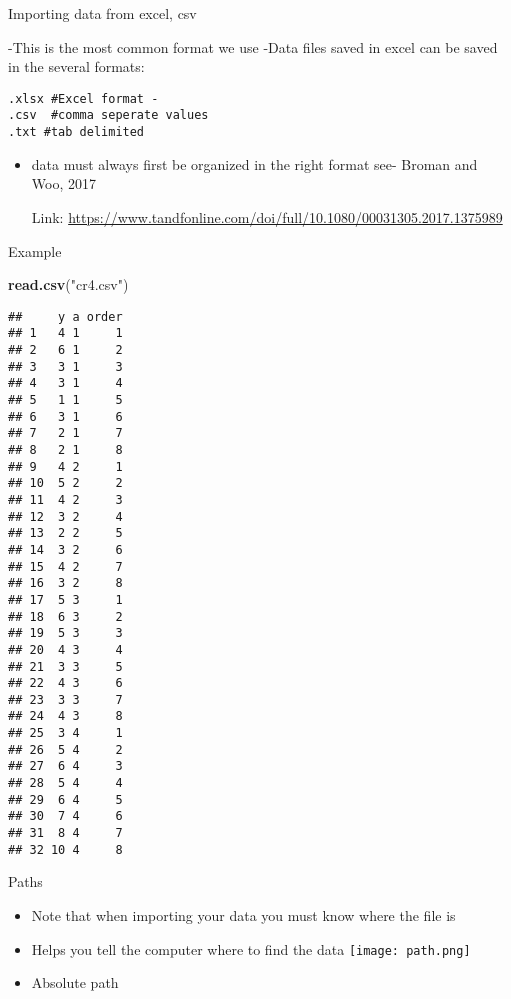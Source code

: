 \documentclass[
  ignorenonframetext,
]{beamer}
\newenvironment{Shaded}{\begin{snugshade}}{\end{snugshade}}
\newcommand{\KeywordTok}[1]{\textcolor[rgb]{0.13,0.29,0.53}{\textbf{#1}}}
\newcommand{\NormalTok}[1]{#1}
\newcommand{\StringTok}[1]{\textcolor[rgb]{0.31,0.60,0.02}{#1}}
\begin{document}
\begin{frame}[fragile]{Importing data from excel, csv}
\protect\hypertarget{importing-data-from-excel-csv}{}

-This is the most common format we use -Data files saved in excel can be
saved in the several formats:

\begin{verbatim}
.xlsx #Excel format -
.csv  #comma seperate values
.txt #tab delimited
\end{verbatim}

\begin{itemize}
\item
  data must always first be organized in the right format see- Broman
  and Woo, 2017

  Link:
  \url{https://www.tandfonline.com/doi/full/10.1080/00031305.2017.1375989}
\end{itemize}

\end{frame}

\begin{frame}[fragile]{Example}
\protect\hypertarget{example}{}

\begin{Shaded}
\begin{Highlighting}[]
\KeywordTok{read.csv}\NormalTok{(}\StringTok{"cr4.csv"}\NormalTok{)}
\end{Highlighting}
\end{Shaded}

\begin{verbatim}
##     y a order
## 1   4 1     1
## 2   6 1     2
## 3   3 1     3
## 4   3 1     4
## 5   1 1     5
## 6   3 1     6
## 7   2 1     7
## 8   2 1     8
## 9   4 2     1
## 10  5 2     2
## 11  4 2     3
## 12  3 2     4
## 13  2 2     5
## 14  3 2     6
## 15  4 2     7
## 16  3 2     8
## 17  5 3     1
## 18  6 3     2
## 19  5 3     3
## 20  4 3     4
## 21  3 3     5
## 22  4 3     6
## 23  3 3     7
## 24  4 3     8
## 25  3 4     1
## 26  5 4     2
## 27  6 4     3
## 28  5 4     4
## 29  6 4     5
## 30  7 4     6
## 31  8 4     7
## 32 10 4     8
\end{verbatim}

\end{frame}

\begin{frame}{Paths}
\protect\hypertarget{paths}{}

\begin{itemize}
\item
  Note that when importing your data you must know where the file is
\item
  Helps you tell the computer where to find the data
  \texttt{[image: path.png]}
\item
  Absolute path
\end{itemize}

\end{frame}
\end{document}
